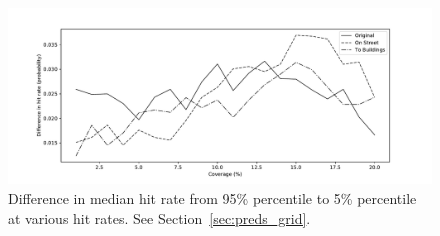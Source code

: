 \documentclass[twoside,a4paper,twocolumn,10pt]{article}
\theoremstyle{plain}
\theoremstyle{definition}
\begin{document}
\begin{figure}
  \includegraphics[width=\textwidth]{hit_rates_grid_vary.pdf}
  \caption{Difference in median hit rate from 95\% percentile to 5\% percentile at
  various hit rates.  See Section~\ref{sec:preds_grid}.}
  \label{fig:hit_rates_grid}
\end{figure}
\end{document}

